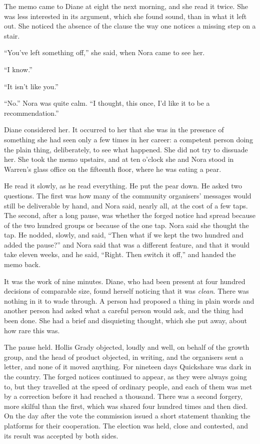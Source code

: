 The memo came to Diane at eight the next morning, and she read it twice. She was less interested in its argument, which she found sound, than in what it left out. She noticed the absence of the clause the way one notices a missing step on a stair.

``You've left something off,'' she said, when Nora came to see her.

``I know.''

``It isn't like you.''

``No.'' Nora was quite calm. ``I thought, this once, I'd like it to be a recommendation.''

Diane considered her. It occurred to her that she was in the presence of something she had seen only a few times in her career: a competent person doing the plain thing, deliberately, to see what happened. She did not try to dissuade her. She took the memo upstairs, and at ten o'clock she and Nora stood in Warren's glass office on the fifteenth floor, where he was eating a pear.

He read it slowly, as he read everything. He put the pear down. He asked two questions. The first was how many of the community organisers' messages would still be deliverable by hand, and Nora said, nearly all, at the cost of a few taps. The second, after a long pause, was whether the forged notice had spread because of the two hundred groups or because of the one tap. Nora said she thought the tap. He nodded, slowly, and said, ``Then what if we kept the two hundred and added the pause?'' and Nora said that was a different feature, and that it would take eleven weeks, and he said, ``Right. Then switch it off,'' and handed the memo back.

It was the work of nine minutes. Diane, who had been present at four hundred decisions of comparable size, found herself noticing that it was \emph{clean}. There was nothing in it to wade through. A person had proposed a thing in plain words and another person had asked what a careful person would ask, and the thing had been done. She had a brief and disquieting thought, which she put away, about how rare this was.

The pause held. Hollis Grady objected, loudly and well, on behalf of the growth group, and the head of product objected, in writing, and the organisers sent a letter, and none of it moved anything. For nineteen days Quickshare was dark in the country. The forged notices continued to appear, as they were always going to, but they travelled at the speed of ordinary people, and each of them was met by a correction before it had reached a thousand. There was a second forgery, more skilful than the first, which was shared four hundred times and then died. On the day after the vote the commission issued a short statement thanking the platforms for their cooperation. The election was held, close and contested, and its result was accepted by both sides.

